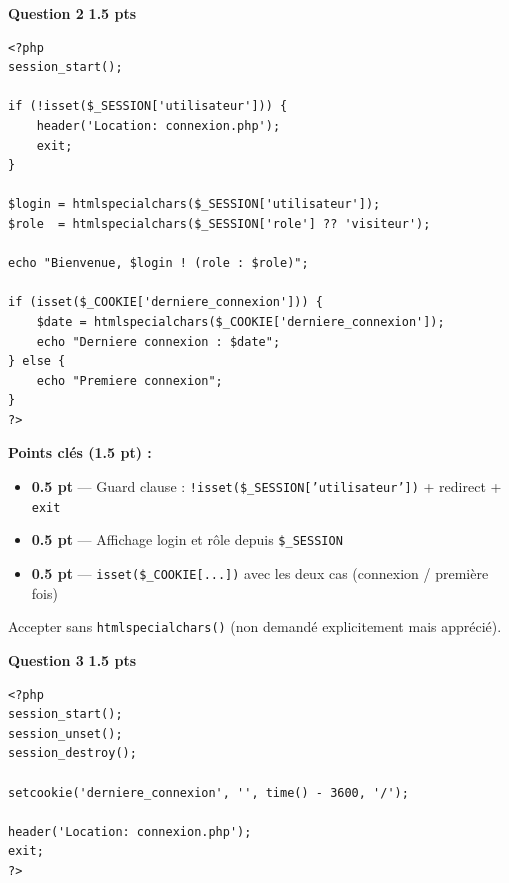 \documentclass[11pt,a4paper]{article}
\newcommand{\pts}[1]{%
  \hfill\colorbox{pointsbg}{\textcolor{uirgold}{\bfseries\small #1 pts}}%
}
\begin{document}
\bigskip

\noindent\textbf{Question 2}\pts{1.5}

\begin{tcolorbox}[corrbox, title={Corrigé Q2 --- début de catalogue.php}]
\begin{lstlisting}[language=PHP2]
<?php
session_start();

if (!isset($_SESSION['utilisateur'])) {
    header('Location: connexion.php');
    exit;
}

$login = htmlspecialchars($_SESSION['utilisateur']);
$role  = htmlspecialchars($_SESSION['role'] ?? 'visiteur');

echo "Bienvenue, $login ! (role : $role)";

if (isset($_COOKIE['derniere_connexion'])) {
    $date = htmlspecialchars($_COOKIE['derniere_connexion']);
    echo "Derniere connexion : $date";
} else {
    echo "Premiere connexion";
}
?>
\end{lstlisting}
\end{tcolorbox}

\begin{tcolorbox}[notebox]
\textbf{Points clés (1.5 pt) :}
\begin{itemize}[itemsep=1pt, topsep=0pt]
  \item \textbf{0.5 pt} --- Guard clause : \texttt{!isset(\$\_SESSION['utilisateur'])} + redirect + \texttt{exit}
  \item \textbf{0.5 pt} --- Affichage login et rôle depuis \texttt{\$\_SESSION}
  \item \textbf{0.5 pt} --- \texttt{isset(\$\_COOKIE[...])} avec les deux cas (connexion / première fois)
\end{itemize}
Accepter sans \texttt{htmlspecialchars()} (non demandé explicitement mais apprécié).
\end{tcolorbox}

\bigskip

\noindent\textbf{Question 3}\pts{1.5}

\begin{tcolorbox}[corrbox, title={Corrigé Q3 --- deconnexion.php}]
\begin{lstlisting}[language=PHP2]
<?php
session_start();
session_unset();
session_destroy();

setcookie('derniere_connexion', '', time() - 3600, '/');

header('Location: connexion.php');
exit;
?>
\end{lstlisting}
\end{tcolorbox}
\end{document}
